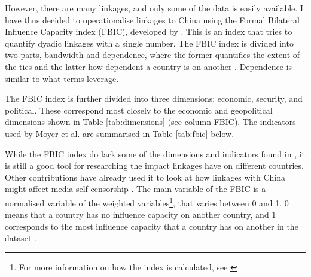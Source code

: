However, there are many linkages, and only some of the data is easily available. I have thus decided to operationalise linkages to China using the Formal Bilateral Influence Capacity index (FBIC), developed by \citet{moyer_china-us_2021}. This is an index that tries to quantify dyadic linkages with a single number. The FBIC index is divided into two parts, bandwidth and dependence, where the former quantifies the extent of the ties and the latter how dependent a country is on another \citep[p. 7]{moyer_china-us_2021}. Dependence is similar to what \citep{levitsky_linkage_2006} terms leverage.

The FBIC index is further divided into three dimensions: economic, security, and political. These correspond most closely to the economic and geopolitical dimensions shown in Table \ref{tab:dimensions} (see column FBIC). The indicators used by Moyer et al. are summarised in Table \ref{tab:fbic} below.

While the FBIC index do lack some of the dimensions and indicators found in \citet{levitsky_linkage_2006}, it is still a good tool for researching the impact linkages have on different countries. Other contributions have already used it to look at how linkages with China might affect media self-censorship \citep{toettoe_foreign_2023}. The main variable of the FBIC is a normalised variable of the weighted variables\footnote{For more information on how the index is calculated, see \citet[pp. 26-31]{moyer_china-us_2021}}, that varies between 0 and 1. 0 means that a country has no influence capacity on another country, and 1 corresponds to the most influence capacity that a country has on another in the dataset \citep[p. 28]{moyer_china-us_2021}. 

\begin{table}[H]
\centering
\caption{Components of the FBIC index}
\label{tab:fbic}
\end{table}

